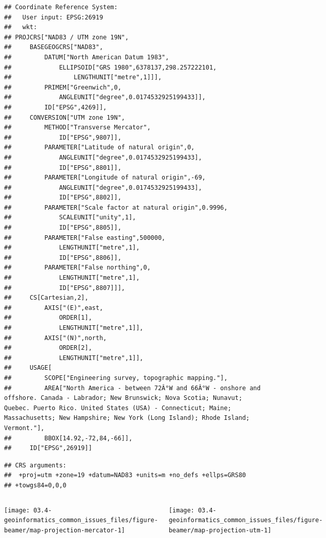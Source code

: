 \documentclass[11pt,dvipsnames,ignorenonframetext,aspectratio=169]{beamer}
\begin{document}
\begin{frame}[fragile]{}
\protect\hypertarget{section-5}{}
\tiny

\begin{verbatim}
## Coordinate Reference System:
##   User input: EPSG:26919 
##   wkt:
## PROJCRS["NAD83 / UTM zone 19N",
##     BASEGEOGCRS["NAD83",
##         DATUM["North American Datum 1983",
##             ELLIPSOID["GRS 1980",6378137,298.257222101,
##                 LENGTHUNIT["metre",1]]],
##         PRIMEM["Greenwich",0,
##             ANGLEUNIT["degree",0.0174532925199433]],
##         ID["EPSG",4269]],
##     CONVERSION["UTM zone 19N",
##         METHOD["Transverse Mercator",
##             ID["EPSG",9807]],
##         PARAMETER["Latitude of natural origin",0,
##             ANGLEUNIT["degree",0.0174532925199433],
##             ID["EPSG",8801]],
##         PARAMETER["Longitude of natural origin",-69,
##             ANGLEUNIT["degree",0.0174532925199433],
##             ID["EPSG",8802]],
##         PARAMETER["Scale factor at natural origin",0.9996,
##             SCALEUNIT["unity",1],
##             ID["EPSG",8805]],
##         PARAMETER["False easting",500000,
##             LENGTHUNIT["metre",1],
##             ID["EPSG",8806]],
##         PARAMETER["False northing",0,
##             LENGTHUNIT["metre",1],
##             ID["EPSG",8807]]],
##     CS[Cartesian,2],
##         AXIS["(E)",east,
##             ORDER[1],
##             LENGTHUNIT["metre",1]],
##         AXIS["(N)",north,
##             ORDER[2],
##             LENGTHUNIT["metre",1]],
##     USAGE[
##         SCOPE["Engineering survey, topographic mapping."],
##         AREA["North America - between 72Â°W and 66Â°W - onshore and offshore. Canada - Labrador; New Brunswick; Nova Scotia; Nunavut; Quebec. Puerto Rico. United States (USA) - Connecticut; Maine; Massachusetts; New Hampshire; New York (Long Island); Rhode Island; Vermont."],
##         BBOX[14.92,-72,84,-66]],
##     ID["EPSG",26919]]
\end{verbatim}

\begin{verbatim}
## CRS arguments:
##  +proj=utm +zone=19 +datum=NAD83 +units=m +no_defs +ellps=GRS80
## +towgs84=0,0,0
\end{verbatim}

\normalsize
\end{frame}

\begin{frame}{}
\protect\hypertarget{section-6}{}
\begin{columns}


\texttt{[image: 03.4-geoinformatics\_common\_issues\_files/figure-beamer/map-projection-mercator-1]} 



\texttt{[image: 03.4-geoinformatics\_common\_issues\_files/figure-beamer/map-projection-utm-1]} 

\end{columns}
\end{frame}
\end{document}
